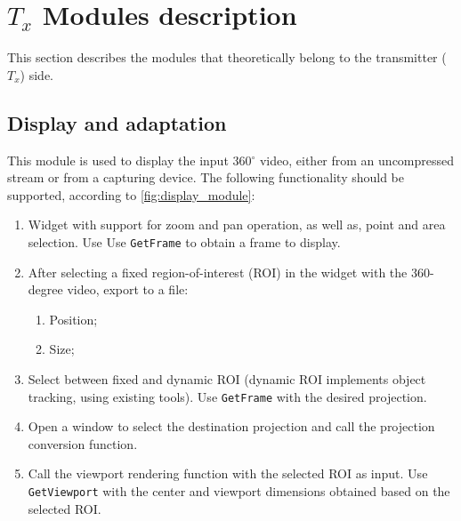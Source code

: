\documentclass{article}
\begin{document}
  

\section{$T_x$ Modules description}

This section describes the modules that theoretically belong to the transmitter ($T_x$) side.

\subsection{Display and adaptation}

This module is used to display the input 360$^\circ$ video, either from an uncompressed stream or from a capturing device.
The following functionality should be supported, according to \cref{fig:display_module}: 

\begin{enumerate}
    \item Widget with support for zoom and pan operation, as well as, point and area selection. Use Use \texttt{GetFrame} to obtain a frame to display.
    
    \item  After selecting a fixed region-of-interest (ROI) in the widget with the 360-degree video, export to a file: 
    \begin{enumerate}
        \item Position;
        \item Size; 
    \end{enumerate}
    
    \item Select between fixed and dynamic ROI (dynamic ROI implements object tracking, using existing tools). Use \texttt{GetFrame} with the desired projection.
    
    \item Open a window to select the destination projection and call the projection conversion function.
    
    \item Call the viewport rendering function with the selected ROI as input. Use \texttt{GetViewport} with the center and viewport dimensions obtained based on the selected ROI.

\end{enumerate}
\end{document}
